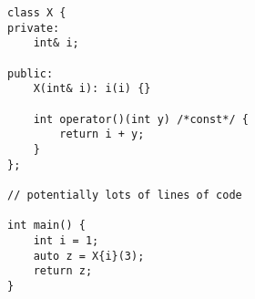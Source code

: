 \begin{lstlisting}[title=\href{https://godbolt.org/z/EP1o1z}{\texttt{godbolt.org/z/EP1o1z}}]
class X {
private:
    int& i;

public:
    X(int& i): i(i) {}

    int operator()(int y) /*const*/ {
        return i + y;
    }
};

// potentially lots of lines of code

int main() {
    int i = 1;
    auto z = X{i}(3);
    return z;
}
\end{lstlisting}
